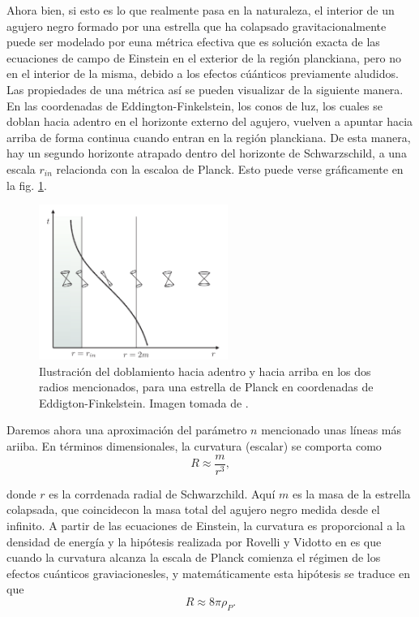 \documentclass[16pt,a4paper]{article}
\numberwithin{equation}{section}
\theoremstyle{definition}
\begin{document}
Ahora bien, si esto es lo que realmente pasa en la naturaleza, el interior de un agujero negro formado por una estrella que ha colapsado gravitacionalmente puede ser modelado por euna métrica efectiva que es solución exacta de las ecuaciones de campo de Einstein en el exterior de la región planckiana, pero no en el interior de la misma, debido a los efectos cúánticos previamente aludidos. Las propiedades de una métrica así se pueden visualizar de la siguiente manera. En las coordenadas de Eddington-Finkelstein, los conos de luz, los cuales se doblan hacia adentro en el horizonte externo del agujero, vuelven a apuntar hacia arriba de forma continua cuando entran en la región planckiana. De esta manera, hay un segundo horizonte atrapado dentro del horizonte de Schwarzschild, a una escala $r_{in}$ relacionda con la escaloa de Planck. Esto puede verse gráficamente en la fig. \ref{fig: light cones}.
\begin{figure}[h!]
	\centering
	\includegraphics[width=0.55\textwidth]{lightcones}
	\caption{Ilustración del doblamiento hacia adentro y hacia arriba en los dos radios mencionados, para una estrella de Planck en coordenadas de Eddigton-Finkelstein. Imagen tomada de \cite{rovelli}.}
	\label{fig: light cones}
\end{figure}

Daremos ahora una aproximación del parámetro $n$ mencionado unas líneas más ariiba. En términos dimensionales, la curvatura (escalar) se comporta como
\begin{equation}
\label{curvature1}
R \approx \frac{m}{r^3},
\end{equation}

donde $r$ es la corrdenada radial de Schwarzchild. Aquí $m$ es la masa de la estrella colapsada, que coincidecon la masa total del agujero negro medida desde el infinito. A partir de las ecuaciones de Einstein, la curvatura es proporcional a la densidad de energía y la hipótesis realizada por Rovelli y Vidotto en \cite{rovelli} es que cuando la curvatura alcanza la escala de Planck comienza el régimen de los efectos cuánticos graviacionesles, y matemáticamente esta hipótesis se traduce en que
\begin{equation}
\label{curvature2}
R \approx 8\pi\rho_P.
\end{equation}
\end{document}
